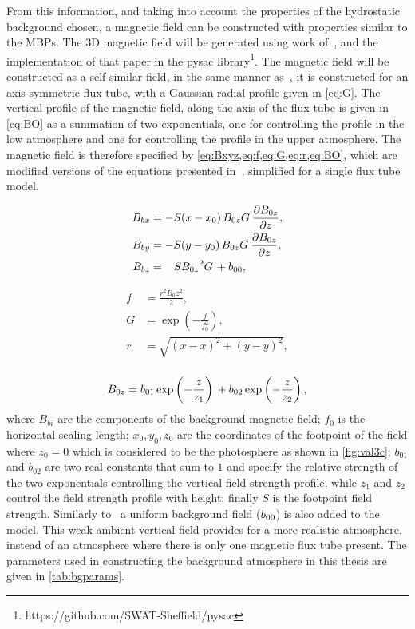 From this information, and taking into account the properties of the hydrostatic background chosen, a magnetic field can be constructed with properties similar to the MBPs.
The 3D magnetic field will be generated using work of~\cite{gent2013, gent2014}, and the implementation of that paper in the pysac library\footnote{https://github.com/SWAT-Sheffield/pysac}.
The magnetic field will be constructed as a self-similar field, in the same manner as~\cite{schluter1958}, it is constructed for an axis-symmetric flux tube, with a Gaussian radial profile given in \cref{eq:G}.
The vertical profile of the magnetic field, along the axis of the flux tube is given in \cref{eq:BO} as a summation of two exponentials, one for controlling the profile in the low atmosphere and one for controlling the profile in the upper atmosphere.
The magnetic field is therefore specified by \cref{eq:Bxyz,eq:f,eq:G,eq:r,eq:BO}, which are modified versions of the equations presented in~\cite{gent2014}, simplified for a single flux tube model.

\begin{equation}\label{eq:Bxyz}
\begin{aligned}
B_{bx} &= -S(x-x_0) {\, {B_{0z}}{G} \:} \frac{\partial {B_{0z}}}{\partial z},
\\
B_{by} &= -S(y-y_0) {\, {B_{0z}}{G} \:} \frac{\partial {B_{0z}}}{\partial z},
\\
B_{bz} &= \phantom{-}S{{B_{0z}}^2{G}  \,} + {b_{00}},
\end{aligned}
\end{equation}


\begin{align}
f &= \frac{r^2 B_0z^2}{2},  \label{eq:f}
\\
G &= \exp\left(-\frac{f}{f_0^2}\right),  \label{eq:G}
\\
r \,   &= \sqrt{(x-x )^2+(y-y )^2},\\  \label{eq:r}
\end{align}

\begin{equation}\label{eq:BO}
{B_{0z}} =
{b_{01}}\exp\left(-\frac{z}{{z_{1}}}\right)\,
+
{b_{02}}\exp\left(-\frac{z}{{z_{2}}}\right),
\end{equation}
where $B_{bi}$ are the components of the background magnetic field; $f_0$ is the horizontal scaling length; $x_0,y_0,z_0$ are the coordinates of the footpoint of the field where $z_0=0$ which is considered to be the photosphere as shown in \cref{fig:val3c}; $b_{01}$ and $b_{02}$ are two real constants that sum to $1$ and specify the relative strength of the two exponentials controlling the vertical field strength profile, while $z_1$ and $z_2$ control the field strength profile with height; finally $S$ is the footpoint field strength.
Similarly to~\cite{gent2014} a uniform background field (${b_{00}}$) is also added to the model.
This weak ambient vertical field provides for a more realistic atmosphere, instead of an atmosphere where there is only one magnetic flux tube present.
The parameters used in constructing the background atmosphere in this thesis are given in \cref{tab:bgparams}.

